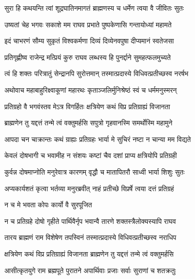 \twolineshloka
{सुरा हि कथयन्ति त्वां शूद्रघातिनमागतं}
{ब्राह्मणस्य च धर्मेण त्वया वै जीवितः सुतः}%

\twolineshloka
{उष्यतां चेह भगवः सकाशे मम राघव}
{प्रभाते पुष्पकेणासि गन्तायोध्यां महामते}%

\twolineshloka
{इदं चाभरणं सौम्य सुकृतं विश्वकर्मणा}
{दिव्यं दिव्येनवपुषा दीप्यमानं स्वतेजसा}%

\twolineshloka
{प्रतिगृह्णीष्व राजेन्द्र मत्प्रियं कुरु राघव}
{लब्धस्य हि पुनर्द्दाने सुमहत्फलमुच्यते}%

\twolineshloka
{त्वं हि शक्तः परित्रातुं सेन्द्रानपि सुरोत्तमान्}
{तस्मात्प्रदास्ये विधिवत्प्रतीच्छस्व नरर्षभ}%

\twolineshloka
{अथोवाच महाबाहुरिक्ष्वाकूणां महारथः}
{कृताञ्जलिर्मुनिश्रेष्ठं स्वं च धर्ममनुस्मरन्}%

\twolineshloka
{प्रतिग्रहो वै भगवंस्तव मेऽत्र विगर्हितः}
{क्षत्रियेण कथं विप्र प्रतिग्राह्यं विजानता}%

\twolineshloka
{ब्राह्मणेन तु यद्दत्तं तन्मे त्वं वक्तुमर्हसि}
{सपुत्रो गृहवानस्मि समर्थोस्मि महामुने}%

\twolineshloka
{आपदा चन चाक्रान्तः कथं ग्राह्यः प्रतिग्रहः}
{भार्या मे सुचिरं नष्टा न चान्या मम विद्यते}%

\twolineshloka
{केवलं दोषभागी च भवामीह न संशयः}
{कष्टां चैव दशां प्राप्य क्षत्रियोपि प्रतिग्रही}%

\twolineshloka
{कुर्वन्न दोषमाप्नोति मनुरेवात्र कारणम्}
{वृद्धौ च मातापितरौ साध्वी भार्या शिशुः सुतः}%

\twolineshloka
{अप्यकार्यशतं कृत्वा भर्तव्या मनुरब्रवीत्}
{नाहं प्रतीच्छे विप्रर्षे त्वया दत्तं प्रतिग्रहं}%

\onelineshloka
{न च मे भवता कोपः कार्यो वै सुरपूजित}%


\twolineshloka
{न च प्रतिग्रहे दोषो गृहीते पार्थिवैर्नृप}
{भवान्वै तारणे शक्तस्त्रैलोक्यस्यापि राघव}%

\twolineshloka
{तारय ब्राह्मणं राम विशेषेण तपस्विनं}
{तस्मात्प्रदास्ये विधिवत्प्रतीच्छस्व नराधिप}%


\twolineshloka
{क्षत्रियेण कथं विप्र प्रतिग्राह्यं विजानता}
{ब्राह्मणेन तु यद्दत्तं तन्मे त्वं वक्तुमर्हसि}%


\twolineshloka
{आसीत्कृतयुगे राम ब्रह्मपूते पुरातने}
{अपार्थिवाः प्रजाः सर्वाः सुराणां च शतक्रतुः}%

